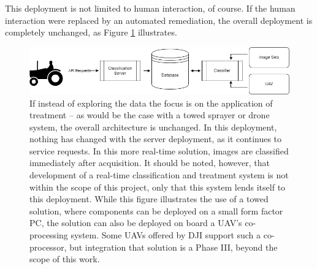 \documentclass[12pt]{article}
\begin{document}
This deployment is not limited to human interaction, of course. If the human interaction were replaced by an automated remediation, the overall deployment is completely unchanged, as Figure \ref{fig:architecture-with-treatment} illustrates.
\begin{figure}[h]
	\centering
	\includegraphics[width=0.8\linewidth]{./figures/treatment-plan.drawio.png}
	\caption[Simplified View of System Architecture]{If instead of exploring the data the focus is on the application of treatment -- as would be the case with a towed sprayer or drone system, the overall architecture is unchanged. In this deployment, nothing has changed with the server deployment, as it continues to service requests. In this more real-time solution, images are classified immediately after acquisition. It should be noted, however, that development of a real-time classification and treatment system is not within the scope of this project, only that this system lends itself to this deployment. While this figure illustrates the use of a towed solution, where components can be deployed on a small form factor PC, the solution can also be deployed on board a UAV's co-processing system. Some UAVs offered by DJI support such a co-processor, but integration that solution is a Phase III, beyond the scope of this work.}
	\label{fig:architecture-with-treatment}
\end{figure}
\end{document}
